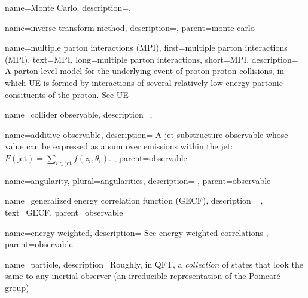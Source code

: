 {
    name=Monte Carlo,
    description={},
}

    {
        name=inverse transform method,
        description={},
        parent=monte-carlo
    }




{
  name=multiple parton interactions (MPI),
  first=multiple parton interactions (MPI),
  text=MPI,
  long=multiple parton interactions,
  short=MPI,
  description={
      A parton-level model for the underlying event of proton-proton collisions, in which UE is formed by interactions of several relatively low-energy partonic consituents of the proton.
      See UE
    }
}



{
    name=collider observable,
    description={},
}

    {
        name=additive observable,
        description={
            A jet substructure observable whose value can be expressed as a sum over emissions within the jet:
            \(F(\text{jet}) = \sum_{i \in \text{jet}} f(z_i, \theta_i)\).
        },
        parent=observable
    }


    {
        name=angularity,
        plural=angularities,
        description={
        },
        parent=observable
    }

    {
        name=generalized energy correlation function (GECF),
        description={
        },
        text=GECF,
        parent=observable
    }

    {
        name=energy-weighted,
        description={
            See energy-weighted correlations
        },
        parent=observable
    }



{
  name=particle,
  description={Roughly, in QFT, a \textit{collection} of states that look the same to any inertial observer (an irreducible representation of the Poincar\'e group)}
}


